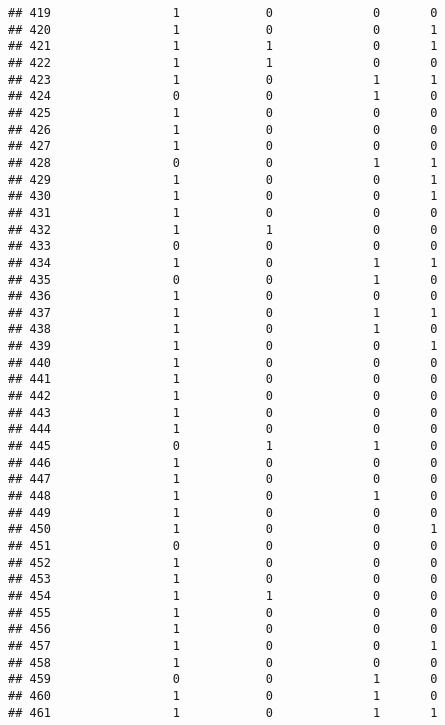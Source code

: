 \documentclass[]{article}
\begin{document}
\begin{verbatim}
## 419                 1            0              0       0
## 420                 1            0              0       1
## 421                 1            1              0       1
## 422                 1            1              0       0
## 423                 1            0              1       1
## 424                 0            0              1       0
## 425                 1            0              0       0
## 426                 1            0              0       0
## 427                 1            0              0       0
## 428                 0            0              1       1
## 429                 1            0              0       1
## 430                 1            0              0       1
## 431                 1            0              0       0
## 432                 1            1              0       0
## 433                 0            0              0       0
## 434                 1            0              1       1
## 435                 0            0              1       0
## 436                 1            0              0       0
## 437                 1            0              1       1
## 438                 1            0              1       0
## 439                 1            0              0       1
## 440                 1            0              0       0
## 441                 1            0              0       0
## 442                 1            0              0       0
## 443                 1            0              0       0
## 444                 1            0              0       0
## 445                 0            1              1       0
## 446                 1            0              0       0
## 447                 1            0              0       0
## 448                 1            0              1       0
## 449                 1            0              0       0
## 450                 1            0              0       1
## 451                 0            0              0       0
## 452                 1            0              0       0
## 453                 1            0              0       0
## 454                 1            1              0       0
## 455                 1            0              0       0
## 456                 1            0              0       0
## 457                 1            0              0       1
## 458                 1            0              0       0
## 459                 0            0              1       0
## 460                 1            0              1       0
## 461                 1            0              1       1

\end{verbatim}
\end{document}
